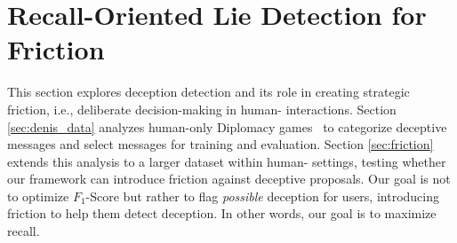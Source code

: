 \section{Recall-Oriented Lie Detection for Friction}
\label{sec:setup}
This section explores deception detection and its role in creating strategic friction, i.e., deliberate decision-making in human- interactions. Section \ref{sec:denis_data} analyzes human-only Diplomacy games~\citep{peskov2020takes} to categorize deceptive messages and select messages for training and evaluation. Section \ref{sec:friction} extends this analysis to a larger dataset within human- settings, testing whether our framework can introduce friction against deceptive proposals. Our goal is not to optimize $F_1$-Score but rather to flag \textit{possible} deception for users, introducing friction to help them detect deception. In other words, our goal is to maximize recall.
%
